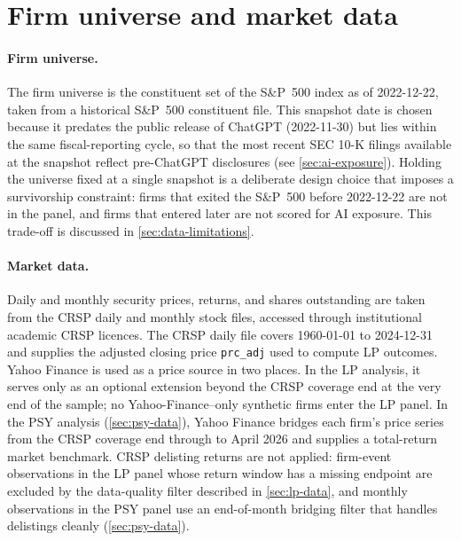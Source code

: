 

\section{Firm universe and market data}
\label{sec:firm-universe}

\paragraph{Firm universe.} The firm universe is the constituent set of the S\&P~500 index as of \mbox{2022-12-22}, taken from a historical S\&P~500 constituent file. This snapshot date is chosen because it predates the public release of ChatGPT (\mbox{2022-11-30}) but lies within the same fiscal-reporting cycle, so that the most recent SEC 10-K filings available at the snapshot reflect pre-ChatGPT disclosures (see \cref{sec:ai-exposure}). Holding the universe fixed at a single snapshot is a deliberate design choice that imposes a survivorship constraint: firms that exited the S\&P~500 before \mbox{2022-12-22} are not in the panel, and firms that entered later are not scored for AI exposure. This trade-off is discussed in \cref{sec:data-limitations}.

\paragraph{Market data.} Daily and monthly security prices, returns, and shares outstanding are taken from the CRSP daily and monthly stock files, accessed through institutional academic CRSP licences. The CRSP daily file covers 1960-01-01 to 2024-12-31 and supplies the adjusted closing price \texttt{prc\_adj} used to compute LP outcomes. Yahoo Finance is used as a price source in two places. In the LP analysis, it serves only as an optional extension beyond the CRSP coverage end at the very end of the sample; no Yahoo-Finance--only synthetic firms enter the LP panel. In the PSY analysis (\cref{sec:psy-data}), Yahoo Finance bridges each firm's price series from the CRSP coverage end through to April 2026 and supplies a total-return market benchmark. CRSP delisting returns are not applied: firm-event observations in the LP panel whose return window has a missing endpoint are excluded by the data-quality filter described in \cref{sec:lp-data}, and monthly observations in the PSY panel use an end-of-month bridging filter that handles delistings cleanly (\cref{sec:psy-data}).

